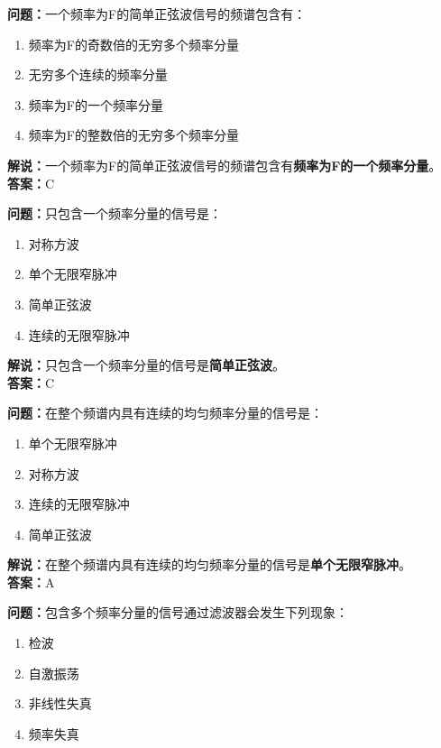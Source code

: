 \textbf{问题：}一个频率为F的简单正弦波信号的频谱包含有：

\begin{enumerate}[label=\Alph*), leftmargin=1.5cm]
	\item 频率为F的奇数倍的无穷多个频率分量
	\item 无穷多个连续的频率分量
	\item 频率为F的一个频率分量
	\item 频率为F的整数倍的无穷多个频率分量
\end{enumerate}

\textbf{解说：}一个频率为F的简单正弦波信号的频谱包含有\textbf{频率为F的一个频率分量}。\\\textbf{答案：}C%



\textbf{问题：}只包含一个频率分量的信号是：
\begin{enumerate}[label=\Alph*), leftmargin=1.5cm]
	\item 对称方波
	\item 单个无限窄脉冲
	\item 简单正弦波
	\item 连续的无限窄脉冲
\end{enumerate}

\textbf{解说：}只包含一个频率分量的信号是\textbf{简单正弦波}。\\\textbf{答案：}C%



\textbf{问题：}在整个频谱内具有连续的均匀频率分量的信号是：

\begin{enumerate}[label=\Alph*), leftmargin=1.5cm]
	\item 单个无限窄脉冲
	\item 对称方波
	\item 连续的无限窄脉冲
	\item 简单正弦波
\end{enumerate}

\textbf{解说：}在整个频谱内具有连续的均匀频率分量的信号是\textbf{单个无限窄脉冲}。\\\textbf{答案：}A%



\textbf{问题：}包含多个频率分量的信号通过滤波器会发生下列现象：

\begin{enumerate}[label=\Alph*), leftmargin=1.5cm]
	\item 检波
	\item 自激振荡
	\item 非线性失真
	\item 频率失真
\end{enumerate}

